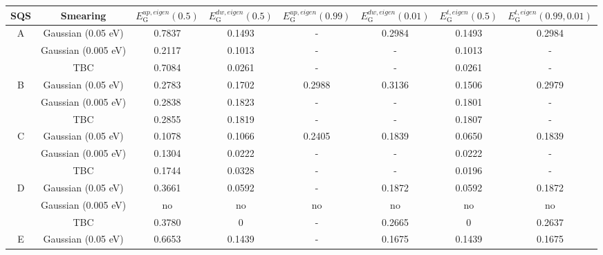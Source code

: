 \newpage
\begin{landscape}
\begin{table}[H]
\centering
\begin{tabular}{@{}cccccccc@{}}
\toprule
SQS                                     & Smearing         & $E_\text{G} ^{up, eigen}(0.5)$ & $E_\text{G} ^{dw, eigen}(0.5)$ & $E_\text{G} ^{up, eigen}(0.99)$ & $E_\text{G} ^{dw, eigen}(0.01)$ & $E_\text{G} ^{t, eigen}(0.5)$ & $E_\text{G} ^{t, eigen}(0.99, 0.01)$ \\ \midrule
\multicolumn{1}{c|}{\multirow{3}{*}{A}} & Gaussian (0.05 eV)  & 0.7837   & 0.1493   & -        & 0.2984   & 0.1493 & 0.2984  \\
\multicolumn{1}{c|}{}                   & Gaussian (0.005 eV) & 0.2117   & 0.1013   & -        & -        & 0.1013 & -       \\
\multicolumn{1}{c|}{}                   & TBC              & 0.7084   & 0.0261   & -        & -        & 0.0261 & -       \\ \midrule
\multicolumn{1}{c|}{\multirow{3}{*}{B}} & Gaussian (0.05 eV)  & 0.2783   & 0.1702   & 0.2988   & 0.3136   & 0.1506 & 0.2979  \\
\multicolumn{1}{c|}{}                   & Gaussian (0.005 eV) & 0.2838   & 0.1823   & -        & -        & 0.1801 & -       \\
\multicolumn{1}{c|}{}                   & TBC              & 0.2855   & 0.1819   & -        & -        & 0.1807 & -       \\ \midrule
\multicolumn{1}{c|}{\multirow{3}{*}{C}} & Gaussian (0.05 eV)  & 0.1078   & 0.1066   & 0.2405   & 0.1839   & 0.0650 & 0.1839  \\
\multicolumn{1}{c|}{}                   & Gaussian (0.005 eV) & 0.1304   & 0.0222   & -        & -        & 0.0222 & -       \\
\multicolumn{1}{c|}{}                   & TBC              & 0.1744   & 0.0328   & -        & -        & 0.0196 & -       \\ \midrule
\multicolumn{1}{c|}{\multirow{3}{*}{D}} & Gaussian (0.05 eV)  & 0.3661   & 0.0592   & -   & 0.1872   & 0.0592 & 0.1872  \\
\multicolumn{1}{c|}{}                   & Gaussian (0.005 eV) & no       & no       & no       & no       & no     & no      \\
\multicolumn{1}{c|}{}                   & TBC              & 0.3780   & 0        & -        & 0.2665   & 0      & 0.2637  \\ \midrule
\multicolumn{1}{c|}{\multirow{3}{*}{E}} & Gaussian (0.05 eV)  & 0.6653   & 0.1439   & -   & 0.1675   & 0.1439 & 0.1675  \\

\end{tabular}
\end{table}
\end{landscape}
